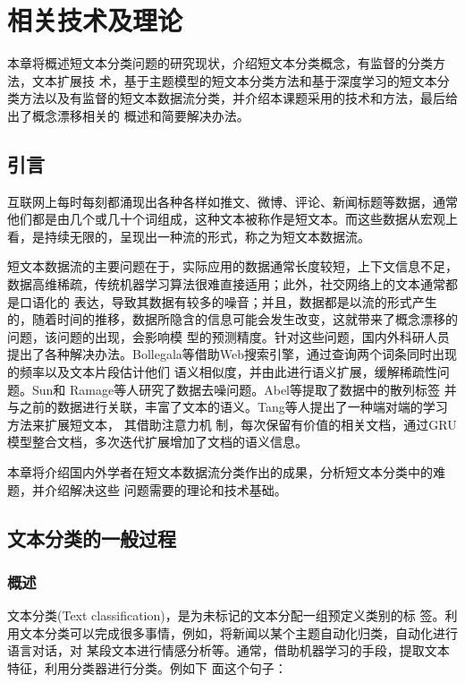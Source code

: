 \chapter{相关技术及理论}
本章将概述短文本分类问题的研究现状，介绍短文本分类概念，有监督的分类方法，文本扩展技
术，基于主题模型的短文本分类方法和基于深度学习的短文本分类方法以及有监督的短文本数据流分类，并介绍本课题采用的技术和方法，最后给出了概念漂移相关的
概述和简要解决办法。

\section{引言}
互联网上每时每刻都涌现出各种各样如推文、微博、评论、新闻标题等数据，通常他们都是由几个或几十个词组成，这种文本被称作是短文本。而这些数据从宏观上看，是持续无限的，呈现出一种流的形式，称之为短文本数据流。

短文本数据流的主要问题在于，实际应用的数据通常长度较短，上下文信息不足，数据高维稀疏，传统机器学习算法很难直接适用；此外，社交网络上的文本通常都是口语化的
表达，导致其数据有较多的噪音；并且，数据都是以流的形式产生的，随着时间的推移，数据所隐含的信息可能会发生改变，这就带来了概念漂移的问题，该问题的出现，会影响模
型的预测精度。针对这些问题，国内外科研人员提出了各种解决办法。Bollegala\cite{meng2013improving}等借助Web搜索引擎，通过查询两个词条同时出现的频率以及文本片段估计他们
语义相似度，并由此进行语义扩展，缓解稀疏性问题。Sun\cite{sun2012short}和
Ramage\cite{ramage2010characterizing}等人研究了数据去噪问题。Abel等提取了数据中的散列标签
并与之前的数据进行关联，丰富了文本的语义。Tang等人提出了一种端对端的学习方法来扩展短文本，
其借助注意力机
制，每次保留有价值的相关文档，通过GRU模型整合文档，多次迭代扩展增加了文档的语义信息。

本章将介绍国内外学者在短文本数据流分类作出的成果，分析短文本分类中的难题，并介绍解决这些
问题需要的理论和技术基础。

\section{文本分类的一般过程}
\subsection{概述}
文本分类(Text classification)\cite{Aggarwal2012A}，是为未标记的文本分配一组预定义类别的标
签。利用文本分类可以完成很多事情，例如，将新闻以某个主题自动化归类，自动化进行语言对话，对
某段文本进行情感分析等。通常，借助机器学习的手段，提取文本特征，利用分类器进行分类。例如下
面这个句子：

